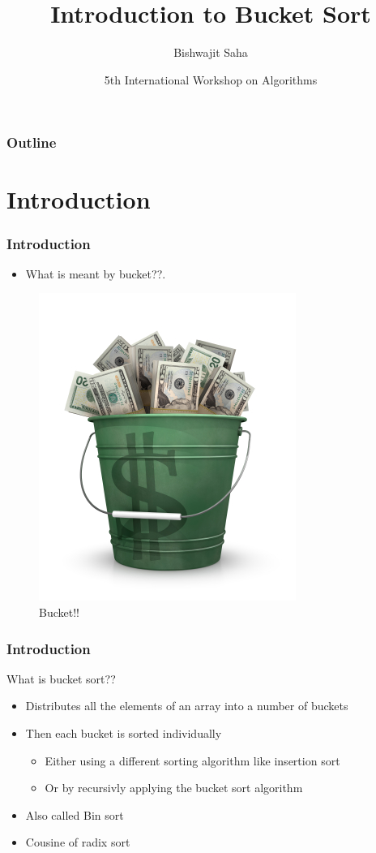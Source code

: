 \documentclass{beamer}
\title{Introduction to Bucket Sort}
\author{Bishwajit Saha}
\institute{Dept. of CSE, BUET}
\date{5th International Workshop on Algorithms}
\begin{document}
\begin{frame}
	\titlepage
\end{frame}

\begin{frame}
	\frametitle{Outline}
	\tableofcontents
\end{frame}
\section{Introduction}

\begin{frame}
	\frametitle{Introduction}
	\begin{itemize}
		\pause\item What is meant by bucket??.
		
	\end{itemize}
	\pause
	\begin{figure}
\includegraphics[scale=1.5]{bucket.png}
\caption{Bucket!!}
\end{figure}	
\end{frame}

\begin{frame}
	\frametitle{Introduction}
	What is bucket sort??
	\begin{itemize}
		\pause\item Distributes all the elements of an array into a number of buckets
		\pause\item Then each bucket is sorted individually
		\begin{itemize}
		\pause\item Either using a different sorting algorithm like insertion sort
		\pause\item Or by recursivly applying the bucket sort algorithm
		\end{itemize}
		\pause\item Also called Bin sort
		\pause\item Cousine of radix sort
		
	\end{itemize}
\end{frame}
\end{document}
